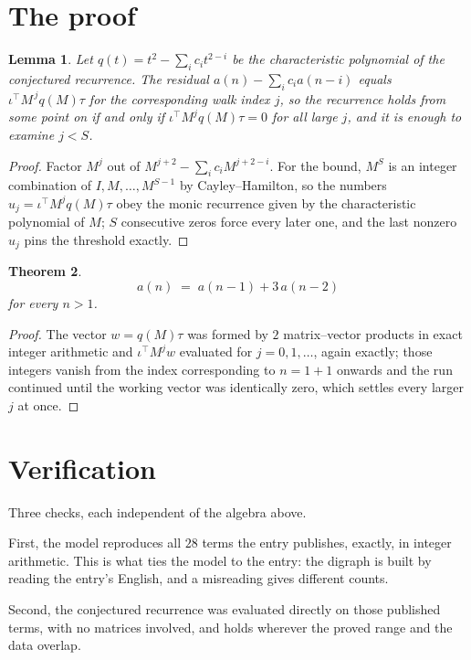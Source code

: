 \documentclass[11pt,a4paper]{article}
\theoremstyle{plain}
\newtheorem{theorem}{Theorem}
\newtheorem{lemma}[theorem]{Lemma}
\theoremstyle{definition}
\begin{document}
\section{The proof}

\begin{lemma}\label{lem:crit}
Let $q(t)=t^{2}-\sum_i c_it^{2-i}$ be the characteristic polynomial of the
conjectured recurrence. The residual $a(n)-\sum_ic_ia(n-i)$ equals
$\iota^{\!\top}M^{\,j}q(M)\tau$ for the corresponding walk index $j$, so the recurrence
holds from some point on if and only if $\iota^{\!\top}M^{j}q(M)\tau=0$ for all large $j$,
and it is enough to examine $j<S$.
\end{lemma}

\begin{proof}
Factor $M^{j}$ out of $M^{j+2}-\sum_ic_iM^{j+2-i}$. For the bound, $M^{S}$
is an integer combination of $I,M,\dots,M^{S-1}$ by Cayley--Hamilton, so the numbers
$u_j=\iota^{\!\top}M^{j}q(M)\tau$ obey the monic recurrence given by the characteristic
polynomial of $M$; $S$ consecutive zeros force every later one, and the last nonzero $u_j$
pins the threshold exactly.
\end{proof}

\begin{theorem}
\[
a(n)\;=\;a(n-1) + 3\,a(n-2)
\]
for every $n>1$.
\end{theorem}

\begin{proof}
The vector $w=q(M)\tau$ was formed by $2$ matrix--vector products in exact integer
arithmetic and $\iota^{\!\top}M^{j}w$ evaluated for $j=0,1,\dots$, again exactly; those
integers vanish from the index corresponding to $n=1+1$ onwards and the run continued
until the working vector was identically zero, which settles every larger $j$ at once.
\end{proof}

\section{Verification}

Three checks, each independent of the algebra above.

First, the model reproduces all $28$ terms the entry publishes, exactly, in integer
arithmetic. This is what ties the model to the entry: the digraph is built by reading the
entry's English, and a misreading gives different counts.

Second, the conjectured recurrence was evaluated directly on those published terms, with no
matrices involved, and holds wherever the proved range and the data overlap.
\end{document}
